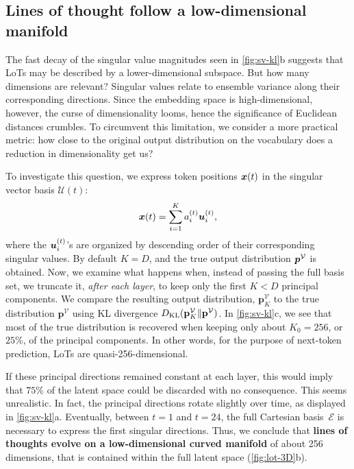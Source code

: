 \documentclass{article} %
\begin{document}
\subsection{Lines of thought follow a low-dimensional manifold}

The fast decay of the singular value magnitudes seen in \cref{fig:sv-kl}b suggests that LoTs may be described by a lower-dimensional subspace.
But how many dimensions are relevant?
Singular values relate to ensemble variance along their corresponding directions. Since the embedding space is high-dimensional, however, the curse of dimensionality looms, hence the significance of Euclidean distances crumbles.
To circumvent this limitation, we consider a more practical metric: how close to the original output distribution on the vocabulary does a reduction in dimensionality get us?

To investigate this question, we express token positions ${\bm{x}}(t)$ in the singular vector basis $\mathcal{U}(t)$:
\[
    {\bm{x}}(t) = \sum_{i=1}^K a_{i}^{(t)} {\bm{u}}_i^{(t)},
\]
where the ${\bm{u}}_i^{(t)}$'s are organized by descending order of their corresponding singular values.
By default $K = D$, and the true output distribution ${\bm{p}}^\mathcal{V}$ is obtained.
Now, we examine what happens when, instead of passing the full basis set, we truncate it, \textit{after each layer}, to keep only the first $K < D$ principal components.
We compare the resulting output distribution, $\mathbf{p}^\mathcal{V}_K$ to the true distribution $\mathbf{p}^\mathcal{V}$ using KL divergence $D_{\mathrm{KL}} ( \mathbf{p}^\mathcal{V}_K \Vert \mathbf{p}^\mathcal{V} ) $.
In \cref{fig:sv-kl}c, we see that most of the true distribution is recovered when keeping only about $K_0 = 256$, or $25\%$, of the principal components.
In other words, for the purpose of next-token prediction, LoTs are quasi-256-dimensional.

If these principal directions remained constant at each layer, this would imply that $75\%$ of the latent space could be discarded with no consequence.
This seems unrealistic.
In fact, the principal directions rotate slightly over time, as displayed in \cref{fig:sv-kl}a.
Eventually, between $t=1$ and $t=24$, the full Cartesian basis~$\mathcal{E}$ is necessary to express the first singular directions.
Thus, we conclude that \textbf{lines of thoughts evolve on a low-dimensional curved manifold} of about 256 dimensions, that is contained within the full latent space (\cref{fig:lot-3D}b).

\end{document}

